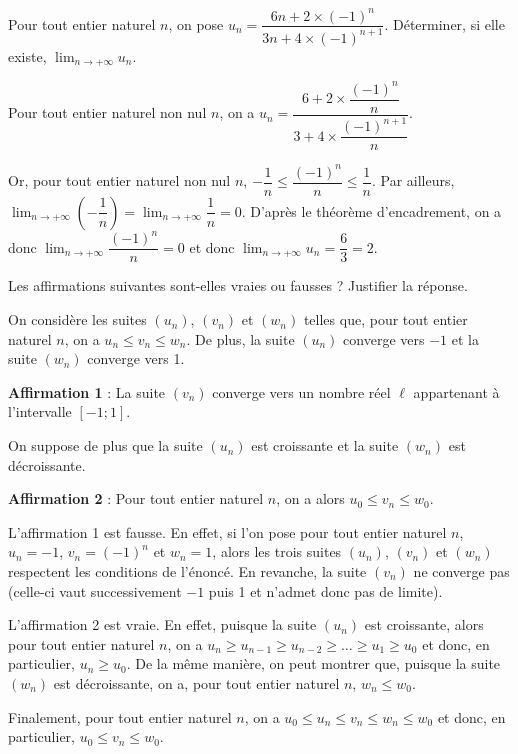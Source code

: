 \documentclass[11pt,fleqn, openany]{book} %
\begin{document}
\begin{exercise}Pour tout entier naturel $n$, on pose $u_n=\dfrac{6n+2\times (-1)^n}{3n+4\times(-1)^{n+1}}$. Déterminer, si elle existe, $\displaystyle\lim_{n \to + \infty}u_n$.\end{exercise}

\begin{solution}Pour tout entier naturel non nul $n$, on a $ u_n = \dfrac{6+2\times \dfrac{(-1)^n}{n}}{3+4\times \dfrac{(-1)^{n+1}}{n}} $.

Or, pour tout entier naturel non nul $n$, $-\dfrac{1}{n} \leqslant \dfrac{(-1)^n}{n} \leqslant \dfrac{1}{n}$. Par ailleurs, $\displaystyle \lim_{n\to + \infty} \left(-\dfrac{1}{n}\right)=\displaystyle \lim_{n\to + \infty} \dfrac{1}{n}=0$. D'après le théorème d'encadrement, on a donc $\displaystyle \lim_{n\to + \infty} \dfrac{(-1)^n}{n}=0$ et donc $\displaystyle \lim_{n\to + \infty} u_n = \dfrac{6}{3}=2$.
\end{solution}

\begin{exercise}[subtitle={(Métropole 2024)}]Les affirmations suivantes sont-elles vraies ou fausses ? Justifier la réponse.

On considère les suites $(u_n)$, $(v_n)$ et $(w_n)$ telles que, pour tout entier naturel $n$, on a $u_n \leqslant v_n \leqslant w_n$. De plus, la suite $(u_n)$ converge vers $-1$ et la suite $(w_n)$ converge vers 1.

\textbf{Affirmation 1} : La suite $(v_n)$ converge vers un nombre réel $\ell$ appartenant à l'intervalle $[-1;1]$.

On suppose de plus que la suite $(u_n)$ est croissante et la suite $(w_n)$ est décroissante.

\textbf{Affirmation 2} : Pour tout entier naturel $n$, on a alors $u_0 \leqslant v_n \leqslant w_0$.
\end{exercise}

\begin{solution}
L'affirmation 1 est fausse. En effet, si l'on pose pour tout entier naturel $n$, $u_n=-1$, $v_n=(-1)^n$ et $w_n=1$, alors les trois suites $(u_n)$, $(v_n)$ et $(w_n)$ respectent les conditions de l'énoncé. En revanche, la suite $(v_n)$ ne converge pas (celle-ci vaut successivement $-1$ puis 1 et n'admet donc pas de limite).

L'affirmation 2 est vraie. En effet, puisque la suite $(u_n)$ est croissante, alors pour tout entier naturel $n$, on a $u_{n}\geqslant u_{n-1} \geqslant u_{n-2} \geqslant \ldots \geqslant u_1 \geqslant u_0$ et donc, en particulier, $u_n\geqslant u_0$. De la même manière, on peut montrer que, puisque la suite $(w_n)$ est décroissante, on a, pour tout entier naturel $n$, $w_n\leqslant w_0$.

Finalement, pour tout entier naturel $n$, on a $u_0 \leqslant u_n \leqslant v_n \leqslant w_n \leqslant w_0$ et donc, en particulier, $u_0 \leqslant v_n \leqslant w_0$.
\newpage
\end{solution}
\end{document}

